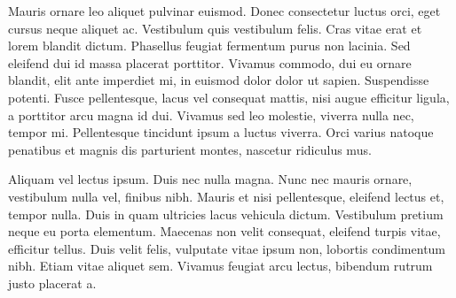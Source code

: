     Mauris ornare leo aliquet pulvinar euismod. Donec consectetur luctus orci, eget cursus neque aliquet ac. Vestibulum quis vestibulum felis. Cras vitae erat et lorem blandit dictum. Phasellus feugiat fermentum purus non lacinia. Sed eleifend dui id massa placerat porttitor. Vivamus commodo, dui eu ornare blandit, elit ante imperdiet mi, in euismod dolor dolor ut sapien. Suspendisse potenti. Fusce pellentesque, lacus vel consequat mattis, nisi augue efficitur ligula, a porttitor arcu magna id dui. Vivamus sed leo molestie, viverra nulla nec, tempor mi. Pellentesque tincidunt ipsum a luctus viverra. Orci varius natoque penatibus et magnis dis parturient montes, nascetur ridiculus mus.\par

    Aliquam vel lectus ipsum. Duis nec nulla magna. Nunc nec mauris ornare, vestibulum nulla vel, finibus nibh. Mauris et nisi pellentesque, eleifend lectus et, tempor nulla. Duis in quam ultricies lacus vehicula dictum. Vestibulum pretium neque eu porta elementum. Maecenas non velit consequat, eleifend turpis vitae, efficitur tellus. Duis velit felis, vulputate vitae ipsum non, lobortis condimentum nibh. Etiam vitae aliquet sem. Vivamus feugiat arcu lectus, bibendum rutrum justo placerat a. \par
